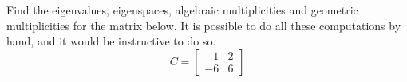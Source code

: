 Find the eigenvalues, eigenspaces, algebraic multiplicities and geometric multiplicities for the matrix below.  It is possible to do all these computations by hand, and it would be instructive to do so.
%
\begin{equation*}
C=
\begin{bmatrix}
 -1 & 2 \\
 -6 & 6
\end{bmatrix}
\end{equation*}